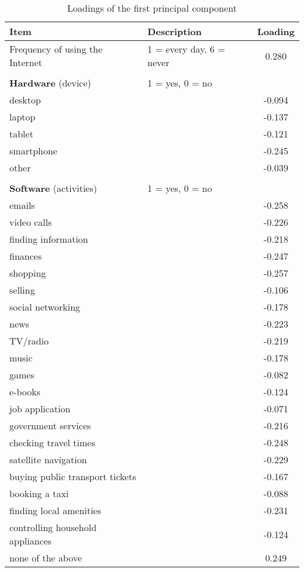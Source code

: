 \documentclass[12pt]{article}
\begin{document}
    \begin{table}[h!]
        \centering
        \caption{Loadings of the first principal component}
        \label{tab:pc1_loadings}
        \begin{tabular}{llc}
            \toprule
            Item & Description & Loading \\
            \midrule
            Frequency of using the Internet & 1 = every day, 6 = never & 0.280 \\
            & & \\
            \textbf{Hardware} (device) & 1 = yes, 0 = no & \\
            desktop &  & -0.094 \\
            laptop &  & -0.137 \\
            tablet &  & -0.121 \\
            smartphone &  & -0.245 \\
            other &  & -0.039 \\
            & & \\
            \textbf{Software} (activities) & 1 = yes, 0 = no & \\
            emails &  & -0.258 \\
            video calls &  & -0.226 \\
            finding information &  & -0.218 \\
            finances &  & -0.247 \\
            shopping &  & -0.257 \\
            selling &  & -0.106 \\
            social networking &  & -0.178 \\
            news &  & -0.223 \\
            TV/radio &  & -0.219 \\
            music &  & -0.178 \\
            games &  & -0.082 \\
            e-books &  & -0.124 \\
            job application &  & -0.071 \\
            government services &  & -0.216 \\
            checking travel times &  & -0.248 \\
            satellite navigation &  & -0.229 \\
            buying public transport tickets &  & -0.167 \\
            booking a taxi &  & -0.088 \\
            finding local amenities &  & -0.231 \\
            controlling household appliances &  & -0.124 \\
            none of the above &  & 0.249 \\
            \bottomrule
        \end{tabular}
    \end{table}
\end{document}
